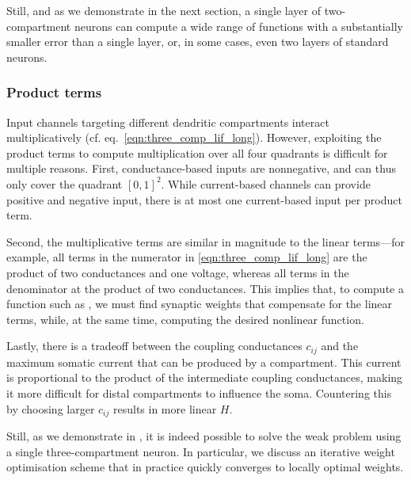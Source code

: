 Still, and as we demonstrate in the next section, a single layer of two-compartment neurons can compute a wide range of functions with a substantially smaller error than a single layer, or, in some cases, even two layers of standard \LIF neurons.

\subsubsection{Product terms}
Input channels targeting different dendritic compartments interact multiplicatively (cf. eq.~\ref{eqn:three_comp_lif_long}).
However, exploiting the product terms to compute multiplication over all four quadrants is difficult for multiple reasons.
First, conductance-based inputs are nonnegative, and can thus only cover the quadrant $[0, 1]^2$.
While current-based channels can provide positive and negative input, there is at most one current-based input per product term.

Second, the multiplicative terms are similar in magnitude to the linear terms---for example, all terms in the numerator in \cref{eqn:three_comp_lif_long} are the product of two conductances and one voltage, whereas all terms in the denominator at the product of two conductances.
This implies that, to compute a function such as \XOR, we must find synaptic weights that compensate for the linear terms, while, at the same time, computing the desired nonlinear function.

Lastly, there is a tradeoff between the coupling conductances $c_{ij}$ and the maximum somatic current that can be produced by a compartment.
This current is proportional to the product of the intermediate coupling conductances, making it more difficult for distal compartments to influence the soma.
Countering this by choosing larger $c_{ij}$ results in more linear $H$.

Still, as we demonstrate in , it is indeed possible to solve the weak \XOR problem using a single three-compartment neuron.
In particular, we discuss an iterative weight optimisation scheme that in practice quickly converges to locally optimal weights.

